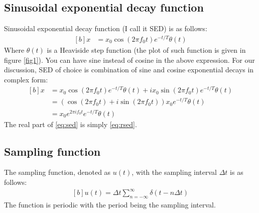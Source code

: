 \documentclass[letterpaper, 11pt]{article}
\newcommand{\sed}[2]{#2_{0}e^{2\pi if_{0}#1}e^{-#1/T} \theta (#1)} %
\newcommand{\fsum}[1]{\sum_{#1 = -\infty}^{\infty}}
\newcommand{\spf}[2]{\Delta #1 \fsum{#2} \delta (#1 - #2 \Delta #1)}
\numberwithin{equation}{section}
\numberwithin{figure}{section}
\begin{document}
\subsection{Sinusoidal exponential decay function}
Sinusoidal exponential decay function (I call it SED) is as follows:
\begin{equation}
	\begin{aligned}[b]
		x &= x_{0}\cos{(2\pi f_{0}t)}e^{-t/T} \theta(t)
		\label{eq:rsed}
	\end{aligned}
\end{equation}
Where \(\theta (t)\) is a Heaviside step function (the plot of such function is given in figure \ref{fig1}). You can have sine instead of cosine in the above expression. For our discussion, SED of choice is combination of sine and cosine exponential decays in complex form:
\begin{equation}
	\begin{aligned}[b]
		x	&= x_{0}\cos{(2\pi f_{0}t)}e^{-t/T} \theta(t)+ i x_{0}\sin{(2\pi f_{0}t)}e^{-t/T} \theta(t)\\
			&= (\cos{(2\pi f_{0}t)} +i \sin{(2\pi f_{0}t)})x_{0}e^{-t/T} \theta(t) \\
			&= \sed{t}{x}
			\label{eq:sed}
	\end{aligned}
\end{equation}
The real part of \eqref{eq:sed} is simply \eqref{eq:rsed}.

\subsection{Sampling function}
The sampling function, denoted as \(u(t)\), with the sampling interval \(\Delta t\) is as follows:
\begin{equation}
	\begin{aligned}[b]
		u(t) = \spf{t}{n}
	\end{aligned}
\end{equation}
The function is periodic with the period being the sampling interval. 
\end{document}
